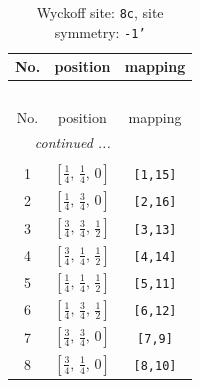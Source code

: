 \documentclass[fleqn,8pt]{jsarticle}
\begin{document}
\renewcommand{\arraystretch}{1.2}
\begin{longtable}{ccc}
\caption{Wyckoff site: {\tt 8c}, site symmetry: {\tt -1'}}
 \\
 \hline \hline
No. & position & mapping \\ \hline \endfirsthead

\multicolumn{2}{l}{\tablename\ \thetable{}} \\
 \hline \hline
No. & position & mapping \\ \hline \endhead

 \hline \hline
\multicolumn{2}{r}{\footnotesize\it continued ...} \\ \endfoot

 \hline \hline
\multicolumn{2}{r}{} \\ \endlastfoot

1 & $\left[ \frac{1}{4},\, \frac{1}{4},\, 0 \right]$ & {\tt [1,15]} \\ \hline
2 & $\left[ \frac{1}{4},\, \frac{3}{4},\, 0 \right]$ & {\tt [2,16]} \\ \hline
3 & $\left[ \frac{3}{4},\, \frac{3}{4},\, \frac{1}{2} \right]$ & {\tt [3,13]} \\ \hline
4 & $\left[ \frac{3}{4},\, \frac{1}{4},\, \frac{1}{2} \right]$ & {\tt [4,14]} \\ \hline
5 & $\left[ \frac{1}{4},\, \frac{1}{4},\, \frac{1}{2} \right]$ & {\tt [5,11]} \\ \hline
6 & $\left[ \frac{1}{4},\, \frac{3}{4},\, \frac{1}{2} \right]$ & {\tt [6,12]} \\ \hline
7 & $\left[ \frac{3}{4},\, \frac{3}{4},\, 0 \right]$ & {\tt [7,9]} \\ \hline
8 & $\left[ \frac{3}{4},\, \frac{1}{4},\, 0 \right]$ & {\tt [8,10]} \\
\end{longtable}
\renewcommand{\arraystretch}{1.2}
\end{document}
